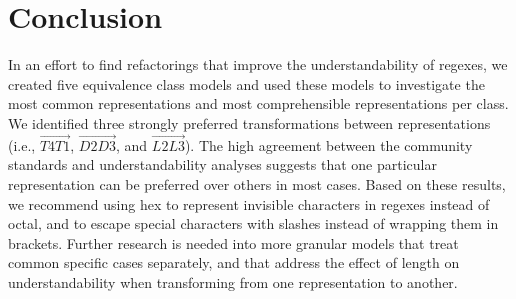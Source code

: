 
\section{Conclusion}
In an effort to find refactorings that improve the understandability of regexes, we created five equivalence class models and used these models to investigate the most common representations and most comprehensible representations per class.  
We  identified three strongly preferred transformations between representations (i.e., $\overrightarrow{T4 T1}$, $\overrightarrow{D2 D3}$, and  $\overrightarrow{L2 L3}$). 
 The high agreement between the community standards and understandability analyses  suggests that one particular representation can be preferred over others in most cases.  
Based on these results, we recommend using hex to represent invisible characters in regexes instead of octal, and to escape special characters with slashes instead of wrapping them in brackets.  
Further research is needed into more granular models that treat common specific cases separately, and that address the effect of length on understandability when transforming from one representation to another.
